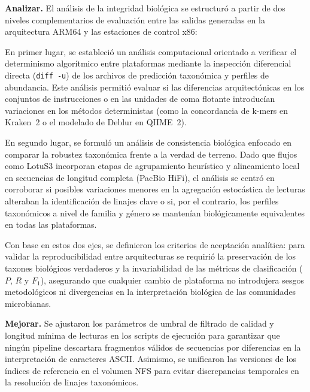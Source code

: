 \documentclass[12pt,oneside,spanish]{book}
\begin{document}
    \textbf{Analizar.} El análisis de la integridad biológica se estructuró a partir de dos niveles complementarios de evaluación entre las salidas generadas en la arquitectura ARM64 y las estaciones de control x86:
    
    En primer lugar, se estableció un análisis computacional orientado a verificar el determinismo algorítmico entre plataformas mediante la inspección diferencial directa (\texttt{diff -u}) de los archivos de predicción taxonómica y perfiles de abundancia. Este análisis permitió evaluar si las diferencias arquitectónicas en los conjuntos de instrucciones o en las unidades de coma flotante introducían variaciones en los métodos deterministas (como la concordancia de k-mers en Kraken~2 o el modelado de Deblur en QIIME~2).
    
    En segundo lugar, se formuló un análisis de consistencia biológica enfocado en comparar la robustez taxonómica frente a la verdad de terreno. Dado que flujos como LotuS3 incorporan etapas de agrupamiento heurístico y alineamiento local en secuencias de longitud completa (PacBio HiFi), el análisis se centró en corroborar si posibles variaciones menores en la agregación estocástica de lecturas alteraban la identificación de linajes clave o si, por el contrario, los perfiles taxonómicos a nivel de familia y género se mantenían biológicamente equivalentes en todas las plataformas.
    
    Con base en estos dos ejes, se definieron los criterios de aceptación analítica: para validar la reproducibilidad entre arquitecturas se requirió la preservación de los taxones biológicos verdaderos y la invariabilidad de las métricas de clasificación ($P$, $R$ y $F_1$), asegurando que cualquier cambio de plataforma no introdujera sesgos metodológicos ni divergencias en la interpretación biológica de las comunidades microbianas.
    
    
    \textbf{Mejorar.} Se ajustaron los parámetros de umbral de filtrado de calidad y longitud mínima de lecturas en los scripts de ejecución para garantizar que ningún pipeline descartara fragmentos válidos de secuencias por diferencias en la interpretación de caracteres ASCII. Asimismo, se unificaron las versiones de los índices de referencia en el volumen NFS para evitar discrepancias temporales en la resolución de linajes taxonómicos.
    
\end{document}
